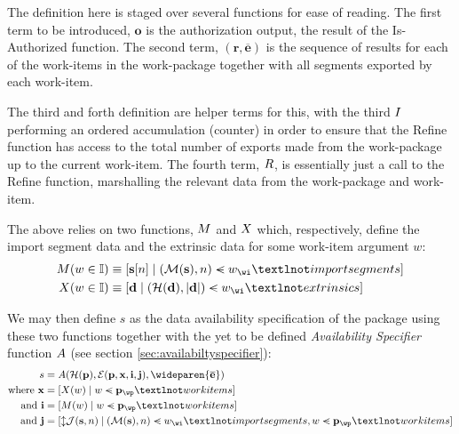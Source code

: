 The definition here is staged over several functions for ease of reading. The first term to be introduced, $\mathbf{o}$ is the authorization output, the result of the Is-Authorized function. The second term, $(\mathbf{r}, \overline{\mathbf{e}})$ is the sequence of results for each of the work-items in the work-package together with all segments exported by each work-item.

The third and forth definition are helper terms for this, with the third $I$ performing an ordered accumulation (\ie counter) in order to ensure that the Refine function has access to the total number of exports made from the work-package up to the current work-item. The fourth term, $R$, is essentially just a call to the Refine function, marshalling the relevant data from the work-package and work-item.


The above relies on two functions, $M$ and $X$ which, respectively, define the import segment data and the extrinsic data for some work-item argument $w$:
\begin{equation}
  \begin{aligned}
    \importsegmentdata(w \in \mathbb{I}) &\equiv [\mathbf{s}[n] \mid (\mathcal{M}(\mathbf{s}), n) \orderedin w_\wi¬importsegments] \\
    \extrinsicdata(w \in \mathbb{I}) &\equiv [\mathbf{d} \mid (\mathcal{H}(\mathbf{d}), |\mathbf{d}|) \orderedin w_\wi¬extrinsics]
  \end{aligned}
\end{equation}

We may then define $s$ as the data availability specification of the package using these two functions together with the yet to be defined \emph{Availability Specifier} function $A$ (see section \ref{sec:availabiltyspecifier}):
\begin{equation}
  \begin{aligned}
    s &= \newavailabilityspecifier(\mathcal{H}(\mathbf{p}), \se(\mathbf{p}, \mathbf{x}, \mathbf{i}, \mathbf{j}), \wideparen{\overline{\mathbf{e}}}) \\
    \nonumber \where \mathbf{x} &= [\extrinsicdata(w) \mid w \orderedin \mathbf{p}_\wp¬workitems]\\
    \nonumber \also \mathbf{i} &= [\importsegmentdata(w) \mid w \orderedin \mathbf{p}_\wp¬workitems]\\
    \nonumber \also \mathbf{j} &= [\var{\mathcal{J}(\mathbf{s}, n)} \mid (\mathcal{M}(\mathbf{s}), n) \orderedin w_\wi¬importsegments, w \orderedin \mathbf{p}_\wp¬workitems]
  \end{aligned}
\end{equation}

